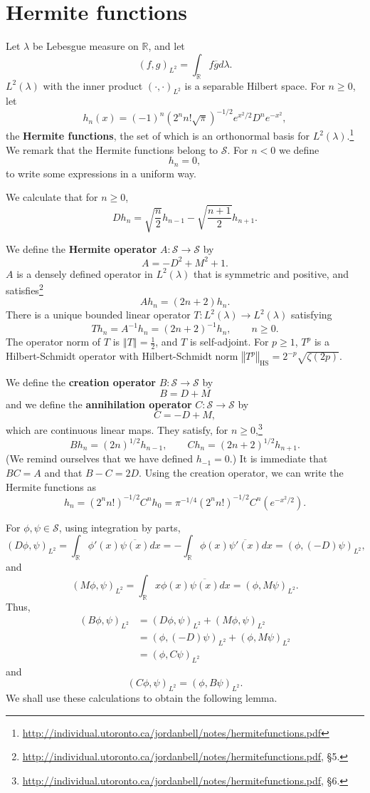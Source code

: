 \documentclass{article}
\newcommand{\norm}[1]{\left\Vert #1 \right\Vert}
\newcommand{\HS}[1]{\left\Vert #1 \right\Vert_{\mathrm{HS}}}
\theoremstyle{definition}
\begin{document}
 


\section{Hermite functions}
Let $\lambda$ be Lebesgue measure on $\mathbb{R}$,
and let 
\[
(f,g)_{L^2} = \int_{\mathbb{R}} f \overline{g} d\lambda.
\]
$L^2(\lambda)$ with the inner product $(\cdot,\cdot)_{L^2}$ is a separable Hilbert space. 
For $n \geq 0$, let
\[
h_n(x) = (-1)^n(2^n n! \sqrt{\pi})^{-1/2} e^{x^2/2} D^n e^{-x^2},
\]
the \textbf{Hermite functions}, the set of which is an orthonormal basis for $L^2(\lambda)$.\footnote{\url{http://individual.utoronto.ca/jordanbell/notes/hermitefunctions.pdf}}
We remark that the Hermite functions belong to $\mathscr{S}$.
For $n<0$ we define
\[
h_n=0,
\]
to write some expressions in a uniform way.

We calculate that for $n \geq 0$,
\[
Dh_n = \sqrt{\frac{n}{2}} h_{n-1}-\sqrt{\frac{n+1}{2}} h_{n+1}.
\]


We define the \textbf{Hermite operator} $A:\mathscr{S} \to \mathscr{S}$ by
\[
A=-D^2+M^2+1.
\]
$A$ is a densely defined operator in $L^2(\lambda)$ that is symmetric and positive, and  satisfies\footnote{\url{http://individual.utoronto.ca/jordanbell/notes/hermitefunctions.pdf},
\S 5.}
\[
Ah_n = (2n+2)h_n.
\]
There is a unique bounded linear operator $T:L^2(\lambda) \to L^2(\lambda)$ satisfying
\[
Th_n=A^{-1}h_n = (2n+2)^{-1} h_n,\qquad n \geq 0.
\]
The operator norm of $T$ is $\norm{T}=\frac{1}{2}$, and $T$ is self-adjoint. For $p \geq 1$, 
$T^p$ is a Hilbert-Schmidt operator with Hilbert-Schmidt norm $\HS{T^p}=2^{-p} \sqrt{\zeta(2p)}$. 

We define the \textbf{creation operator} $B:\mathscr{S} \to \mathscr{S}$ by
\[
B=D+M
\]
and we define the \textbf{annihilation operator} $C:\mathscr{S} \to \mathscr{S}$ by
\[
C=-D+M,
\]
which are continuous linear maps. They satisfy, for $n \geq 0$,\footnote{\url{http://individual.utoronto.ca/jordanbell/notes/hermitefunctions.pdf},
\S 6.}
\[
Bh_n = (2n)^{1/2}h_{n-1},\qquad Ch_n=(2n+2)^{1/2}h_{n+1}.
\]
(We remind ourselves that we have defined $h_{-1}=0$.)
It is immediate that $BC=A$ and that $B-C=2D$. 
Using the creation operator, we can write the Hermite functions as
\[
h_n=(2^n n!)^{-1/2} C^n h_0 = \pi^{-1/4} (2^n n!)^{-1/2} C^n(e^{-x^2/2}).
\]

For $\phi,\psi \in \mathscr{S}$, using integration by parts,
\[
(D\phi,\psi)_{L^2}=\int_{\mathbb{R}} \phi'(x) \overline{\psi(x)} dx
=-\int_{\mathbb{R}} \phi(x) \overline{\psi'(x)} dx
=(\phi,(-D)\psi)_{L^2},
\]
and 
\[
(M\phi,\psi)_{L^2}=\int_{\mathbb{R}} x \phi(x) \overline{\psi(x)} dx
=(\phi,M\psi)_{L^2}.
\]
Thus,
\begin{align*}
(B\phi,\psi)_{L^2}&=(D\phi,\psi)_{L^2} + (M\phi,\psi)_{L^2}\\
&=(\phi,(-D)\psi)_{L^2}+(\phi,M\psi)_{L^2}\\
&=(\phi,C\psi)_{L^2}
\end{align*}
and
\[
(C\phi,\psi)_{L^2}=(\phi,B\psi)_{L^2}.
\]
We shall use these calculations to obtain the following lemma.
\end{document}
